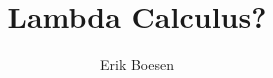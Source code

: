 \documentclass{article}
\begin{document}
\title{Lambda Calculus?}
\author{Erik Boesen}
\maketitle


\end{document}
